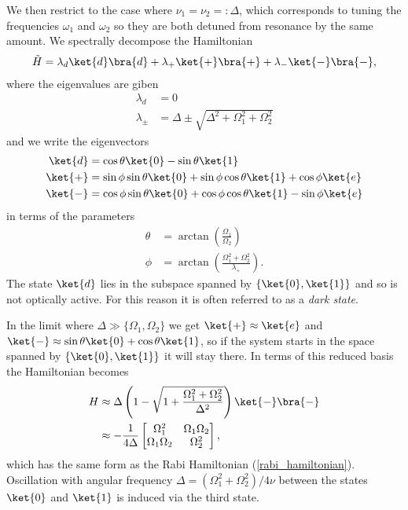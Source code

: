 We then restrict to the case where $\nu_1 = \nu_2 =: \Delta$, which corresponds to tuning the frequencies $\omega_1$ and $\omega_2$ so they are both detuned from resonance by the same amount. We spectrally decompose the Hamiltonian
\begin{align}
  \tilde{H} = \lambda_d \ket{d}\bra{d} + \lambda_{+}\ket{+}\bra{+} + \lambda_{-}\ket{-}\bra{-},
\end{align}
where the eigenvalues are giben 
\begin{align}
  \lambda_d &= 0 \\
  \lambda_\pm &= \Delta \pm \sqrt{\Delta^2 + \Omega_1^2 + \Omega_2^2}
\end{align}
and we write the eigenvectors
\begin{align}
  \ket{d} &%
  =\cos\theta \ket{0} - \sin\theta\ket{1} \\
  \ket{+} &%
  =\sin\phi \sin\theta \ket{0} + \sin\phi \cos\theta\ket{1}  + \cos\phi\ket{e}\\
  \ket{-} &%
  =\cos\phi \sin\theta \ket{0} + \cos\phi \cos\theta\ket{1}  - \sin\phi\ket{e}
\end{align}
in terms of the parameters
\begin{align}
  \theta &= \arctan\left(\frac{\Omega_1}{\Omega_2}\right)\\
  \phi &= \arctan\left(\frac{\Omega_1^2 + \Omega_2^2}{\lambda_{+}}\right).
\end{align}
The state $\ket{d}$ lies in the subspace spanned by $\{\ket{0}, \ket{1}\}$ and so is not optically active. For this reason it is often referred to as a \textit{dark state}.

In the limit where $\Delta \gg \{\Omega_1, \Omega_2\}$ we get $\ket{+} \approx \ket{e}$ and $\ket{-} \approx \sin\theta\ket{0} + \cos\theta\ket{1}$, so if the system starts in the space spanned by $\{\ket{0}, \ket{1}\}$ it will stay there. In terms of this reduced basis the Hamiltonian becomes
\begin{align}
  H &\approx \Delta\left(1 - \sqrt{1 + \frac{\Omega_1^2 + \Omega_2^2}{\Delta^2}}\right)\ket{-}\bra{-} \\
   &\approx -\frac{1}{4\Delta}
  \begin{bmatrix}
    \Omega_1^2 & \Omega_1 \Omega_2 \\
    \Omega_1\Omega_2 & \Omega_2^2
  \end{bmatrix},
\end{align}
which has the same form as the Rabi Hamiltonian (\ref{rabi_hamiltonian}). Oscillation with angular frequency $\Delta = (\Omega_1^2 + \Omega_2^2)/4\nu$ between the states $\ket{0}$ and $\ket{1}$ is induced via the third state.


